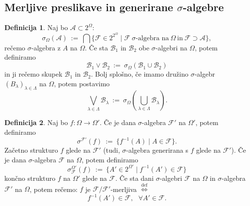 \documentclass[11pt]{article}
\newcommand{\A}{\mathcal{A}}
\newcommand{\B}{\mathcal{B}}
\newcommand{\F}{\mathcal{F}}
\newcommand{\diff}{\overset{\text{def}}{\iff}}
\newcommand{\set}[1]{\{#1\}}
\newcommand{\oklepaj}[1]{\left(#1\right)}
\theoremstyle{definition}
\newtheorem{definicija}{Definicija}[section]
\theoremstyle{definition}
\theoremstyle{definition}
\theoremstyle{definition}
\begin{document}
\subsection{Merljive preslikave in generirane $\sigma$-algebre}
\vspace{0.5cm}

\begin{definicija}

Naj bo $\A \subset 2^\Omega$:
$$\sigma_\Omega(\A) ~:=~ \bigcap\set{\F \in 2^{2^\Omega} \mid \F ~\sigma\text{-algebra na}~\Omega~\text{in}~\F\supset\A},$$
rečemo $\sigma$-algebra z $A$ na $\Omega$. Če sta $\B_1$ in $\B_2$ obe $\sigma$-algebri na $\Omega$, potem definiramo
$$\B_1 \vee \B_2 ~:=~ \sigma_\Omega(\B_1 \cup \B_2)$$
in ji rečemo skupek $\B_1$ in $\B_2$. Bolj splošno, če imamo družino $\sigma$-algebr $(B_\lambda)_{\lambda\in\Lambda}$ na $\Omega$, potem postavimo
$$\bigvee_{\lambda\in\Lambda} \B_\lambda ~:=~ \sigma_\Omega\oklepaj{\bigcup_{\lambda\in\Lambda} \B_\lambda}.$$

\end{definicija}
\vspace{0.5cm}

\begin{definicija}

Naj bo $f: \Omega \rightarrow \Omega'$. Če je dana $\sigma$-algebra $\F'$ na $\Omega'$, potem definiramo
$$\sigma^{\F'}(f) ~:=~ \set{f^{-1}(A) \mid A \in \F }.$$
Začetno strukturo $f$ glede na $\F'$ (tudi, $\sigma$-algebra generirana s $f$ glede na $\F'$). Če je dana $\sigma$-algebra $\F$ na $\Omega$, potem definiramo
$$\sigma_\F^{\Omega'}(f) ~:=~ \set{A' \in 2^{\Omega'} \mid f^{-1}(A') \in \F}$$
končno strukturo $f$ na $\Omega'$ glede na $\F$. Če sta dani $\sigma$-algebri $\F$ na $\Omega$ in $\sigma$-algebra $\F'$ na $\Omega$, potem rečemo: $f$ je $\F/\F'$-merljiva $\diff$
$$f^{-1}(A') \in \F, ~~~\forall A' \in \F.$$

\end{definicija}
\vspace{0.5cm}


\pagebreak

\end{document}
